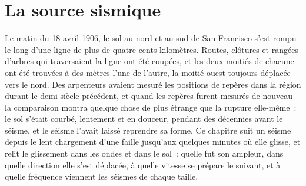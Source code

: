 \chapter{La source sismique}\label{ch:b1:earthquake-source}

Le matin du 18 avril 1906, le sol au nord et au sud de San Francisco
s'est rompu le long d'une ligne de plus de quatre cents kilomètres. Routes, clôtures et
rangées d'arbres qui traversaient la ligne ont été coupées, et les deux moitiés de chacune ont été
trouvées à des mètres l'une de l'autre, la moitié ouest toujours déplacée vers le nord. Des arpenteurs
avaient mesuré les positions de repères dans la région durant le demi-siècle précédent, et quand les repères furent mesurés de nouveau la
comparaison montra quelque chose de plus étrange que la rupture elle-même~: le sol
s'était courbé, lentement et en douceur, pendant des décennies avant le séisme, et le
séisme l'avait laissé reprendre sa forme. Ce chapitre suit un séisme depuis
le lent chargement d'une faille jusqu'aux quelques minutes où elle glisse, et relit
le glissement dans les ondes et dans le sol~: quelle fut son ampleur, dans quelle
direction elle s'est déplacée, à quelle vitesse se prépare le suivant, et à quelle fréquence
viennent les séismes de chaque taille.

